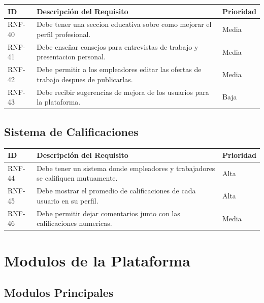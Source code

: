 \documentclass[12pt, a4paper]{article}
\begin{document}
\begin{longtable}{|p{2cm}|p{10cm}|p{2cm}|}
\hline
\textbf{ID} & \textbf{Descripción del Requisito} & \textbf{Prioridad} \\
\hline
\endhead

RNF-40 & Debe tener una seccion educativa sobre como mejorar el perfil profesional. & Media \\
\hline
RNF-41 & Debe enseñar consejos para entrevistas de trabajo y presentacion personal. & Media \\
\hline
RNF-42 & Debe permitir a los empleadores editar las ofertas de trabajo despues de publicarlas. & Media \\
\hline
RNF-43 & Debe recibir sugerencias de mejora de los usuarios para la plataforma. & Baja \\
\hline
\end{longtable}

\subsection{Sistema de Calificaciones}

\begin{longtable}{|p{2cm}|p{10cm}|p{2cm}|}
\hline
\textbf{ID} & \textbf{Descripción del Requisito} & \textbf{Prioridad} \\
\hline
\endhead

RNF-44 & Debe tener un sistema donde empleadores y trabajadores se califiquen mutuamente. & Alta \\
\hline
RNF-45 & Debe mostrar el promedio de calificaciones de cada usuario en su perfil. & Alta \\
\hline
RNF-46 & Debe permitir dejar comentarios junto con las calificaciones numericas. & Media \\
\hline
\end{longtable}

\section{Modulos de la Plataforma}

\subsection{Modulos Principales}
\end{document}
